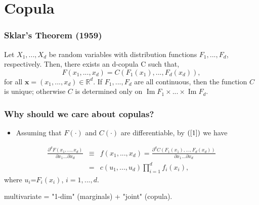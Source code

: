 \documentclass[pdf,10pt,xcolor=dvipsnames,hide notes]{beamer}
\DeclareMathOperator{\Ima}{Im}
\begin{document}
\section{Copula}
	
		\begin{frame}[label=frame1c2]
	\frametitle{Sklar's Theorem (1959)}
	
	
\begin{theorem}
	Let $X_{1},...,X_{d}$ be random variables with distribution functions $F_{1},...,F_{d}$, respectively. Then, there exists an d-copula C such that,
	\begin{equation}
	F\left( x_{1},...,x_{d}\right) =C\left( F_{1}\left( x_{1}\right)
	,...,F_{d}\left( x_{d}\right) \right) ,  \label{1} 
	\end{equation}
\noindent for all $\mathbf{x}=\left( x_{1},...,x_{d}\right) \in
\mathbb{R}^{d}$. If $F_{1},...,F_{d}$ are all continuous, then the function $C$ is unique; otherwise $C$ is determined only on $\Ima F_{1}\times ...\times \Ima F_{d}$. 
\end{theorem}

\end{frame}

\begin{frame}[label=frame2]
\frametitle{Why should we care about copulas?}


	\begin{itemize}
		\justifying
		
		\item Assuming that $F\left( \cdot \right) $ and $C\left( \cdot
		\right) $ are differentiable, by $\left( \ref{1}\right)$ we have
		
	\end{itemize}
	
	\begin{eqnarray}
	\frac{\partial ^{d}F\left( x_{1},...,x_{d}\right) }{\partial
		x_{1}...\partial x_{d}} &\equiv &f\left( x_{1},...,x_{d}\right) =\frac{
		\partial ^{d}C\left( F_{1}\left( x_{1}\right) ,...,F_{d}\left( x_{d}\right)
		\right) }{\partial x_{1}...\partial x_{d}} \\
	&=&c\left( u_{1},...,u_{d}\right) \prod_{i=1}^{d}f_{i}\left( x_{i}\right),
	\label{23}
	\end{eqnarray}%
	where $u_{i}$=$F_{i}\left( x_{i}\right) $, $i=1,...,d$.
	
	\vspace{0.3cm}
	\pause
	
	\begin{exampleblock}{}
		\centering
	multivariate = "1-dim" (marginals) + "joint" (copula).	
	\end{exampleblock}
	
\end{frame}
\end{document}
